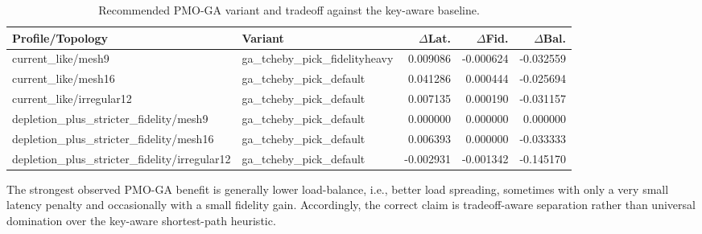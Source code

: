 \begin{table}[t]
\centering
\caption{Recommended PMO-GA variant and tradeoff against the key-aware baseline.}
\begin{tabular}{llrrr}
\hline
Profile/Topology & Variant & $\Delta$Lat. & $\Delta$Fid. & $\Delta$Bal. \\ 
\hline
current\_like/mesh9 & ga\_tcheby\_pick\_fidelityheavy & 0.009086 & -0.000624 & -0.032559 \\ 
current\_like/mesh16 & ga\_tcheby\_pick\_default & 0.041286 & 0.000444 & -0.025694 \\ 
current\_like/irregular12 & ga\_tcheby\_pick\_default & 0.007135 & 0.000190 & -0.031157 \\ 
depletion\_plus\_stricter\_fidelity/mesh9 & ga\_tcheby\_pick\_default & 0.000000 & 0.000000 & 0.000000 \\ 
depletion\_plus\_stricter\_fidelity/mesh16 & ga\_tcheby\_pick\_default & 0.006393 & 0.000000 & -0.033333 \\ 
depletion\_plus\_stricter\_fidelity/irregular12 & ga\_tcheby\_pick\_default & -0.002931 & -0.001342 & -0.145170 \\ 
\hline
\end{tabular}
\end{table}

The strongest observed PMO-GA benefit is generally lower load-balance, i.e., better load spreading, sometimes with only a very small latency penalty and occasionally with a small fidelity gain. Accordingly, the correct claim is tradeoff-aware separation rather than universal domination over the key-aware shortest-path heuristic.
